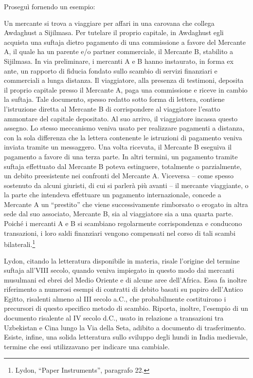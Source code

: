 \documentclass[
  a5paper,
  smalldemyvopaper,10pt,twoside,onecolumn,openright,extrafontsizes,hidelinks]{memoir}
\begin{document}
Proseguì fornendo un esempio:

Un mercante si trova a viaggiare per affari in una carovana che collega
Awdaghust a Sijilmasa. Per tutelare il proprio capitale, in Awdaghust
egli acquista una suftaja dietro pagamento di una commissione a favore
del Mercante A, il quale ha un parente e/o partner commerciale, il
Mercante B, stabilito a Sijilmasa. In via preliminare, i mercanti A e B
hanno instaurato, in forma ex ante, un rapporto di fiducia fondato sullo
scambio di servizi finanziari e commerciali a lunga distanza. Il
viaggiatore, alla presenza di testimoni, deposita il proprio capitale
presso il Mercante A, paga una commissione e riceve in cambio la
suftaja. Tale documento, spesso redatto sotto forma di lettera, contiene
l'istruzione diretta al Mercante B di corrispondere al viaggiatore
l'esatto ammontare del capitale depositato. Al suo arrivo, il
viaggiatore incassa questo assegno. Lo stesso meccanismo veniva usato
per realizzare pagamenti a distanza, con la sola differenza che la
lettera contenente le istruzioni di pagamento veniva inviata tramite un
messaggero. Una volta ricevuta, il Mercante B eseguiva il pagamento a
favore di una terza parte. In altri termini, un pagamento tramite
suftaja effettuato dal Mercante B poteva estinguere, totalmente o
parzialmente, un debito preesistente nei confronti del Mercante A.
Viceversa -- come spesso sostenuto da alcuni giuristi, di cui si parlerà
più avanti -- il mercante viaggiante, o la parte che intendeva
effettuare un pagamento internazionale, concede a Mercante A un
``prestito'' che viene successivamente rimborsato o erogato in altra
sede dal suo associato, Mercante B, sia al viaggiatore sia a una quarta
parte. Poiché i mercanti A e B si scambiano regolarmente corrispondenza
e conducono transazioni, i loro saldi finanziari vengono compensati nel
corso di tali scambi bilaterali.\footnote{Lydon, ``Paper Instruments'',
  paragrafo 22.}

Lydon, citando la letteratura disponibile in materia, risale l'origine
del termine suftaja all'VIII secolo, quando veniva impiegato in questo
modo dai mercanti musulmani ed ebrei del Medio Oriente e di alcune aree
dell'Africa. Essa fa inoltre riferimento a numerosi esempi di contratti
di debito basati su papiro dell'Antico Egitto, risalenti almeno al III
secolo a.C., che probabilmente costituirono i precursori di questo
specifico metodo di scambio. Riporta, inoltre, l'esempio di un documento
risalente al IV secolo d.C., usato in relazione a transazioni tra
Uzbekistan e Cina lungo la Via della Seta, adibito a documento di
trasferimento. Esiste, infine, una solida letteratura sullo sviluppo
degli hundi in India medievale, termine che essi utilizzavano per
indicare una cambiale.
\end{document}
